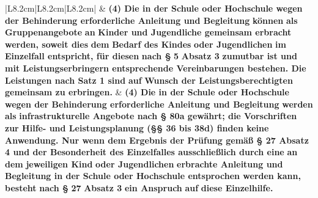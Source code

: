 \documentclass[10pt,a4paper,landscape]{article}
\begin{document}
\begin{longtable}{|L{8.2cm}|L{8.2cm}|L{8.2cm}|}
 & \textbf{(4) Die in der Schule oder Hochschule  \newline wegen der Behinderung erforderliche  \newline Anleitung und Begleitung }\textbf{\textcolor{diffred}{können}}\textbf{ als} \newline \textbf{\textcolor{diffred}{Gruppenangebote}}\textbf{ an }\textbf{\textcolor{diffred}{Kinder und  \newline Jugendliche gemeinsam erbracht  \newline werden, soweit dies}}\textbf{ dem }\textbf{\textcolor{diffred}{Bedarf des  \newline Kindes}}\textbf{ oder Jugendlichen }\textbf{\textcolor{diffred}{im Einzelfall  \newline entspricht, für diesen}}\textbf{ nach \S{} }\textbf{\textcolor{diffred}{5}}\textbf{ Absatz 3} \newline \textbf{\textcolor{diffred}{zumutbar ist und mit  \newline Leistungserbringern entsprechende  \newline Vereinbarungen bestehen. Die  \newline Leistungen nach Satz 1 sind}}\textbf{ auf} \newline \textbf{\textcolor{diffred}{Wunsch der Leistungsberechtigten  \newline gemeinsam zu erbringen.}} & \textbf{(4) Die in der Schule oder Hochschule  \newline wegen der Behinderung erforderliche  \newline Anleitung und Begleitung }\textbf{\textcolor{diffgreen}{werden}}\textbf{ als} \newline \textbf{\textcolor{diffgreen}{infrastrukturelle Angebote nach \S{} 80a  \newline gewährt; die Vorschriften zur Hilfe- und  \newline Leistungsplanung (\S{}\S{} 36 bis 38d) finden  \newline keine Anwendung. Nur wenn dem  \newline Ergebnis der Prüfung gemäß \S{} 27  \newline Absatz 4 und der Besonderheit des  \newline Einzelfalles ausschließlich durch eine}}\textbf{  \newline an dem }\textbf{\textcolor{diffgreen}{jeweiligen Kind}}\textbf{ oder  \newline Jugendlichen }\textbf{\textcolor{diffgreen}{erbrachte Anleitung und  \newline Begleitung in der Schule oder  \newline Hochschule entsprochen werden kann,  \newline besteht}}\textbf{ nach \S{} }\textbf{\textcolor{diffgreen}{27}}\textbf{ Absatz 3 }\textbf{\textcolor{diffgreen}{ein  \newline Anspruch}}\textbf{ auf }\textbf{\textcolor{diffgreen}{diese Einzelhilfe.}} \\

\end{longtable}
\end{document}
